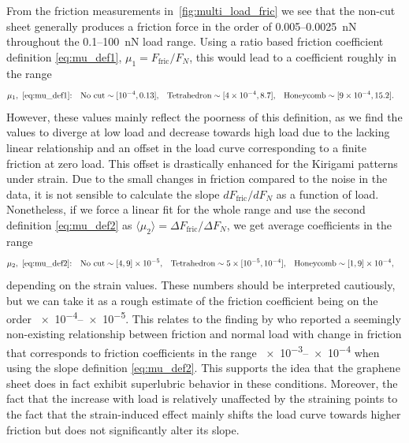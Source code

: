 From the friction measurements in~\cref{fig:multi_load_fric} we see that the
non-cut sheet generally produces a friction force in the order of 0.005--\SI{0.0025}{nN} throughout the 0.1--\SI{100}{nN} load range. Using a ratio based friction coefficient definition \cref{eq:mu_def1}, $\mu_1 = F_{\text{fric}}/{F_N}$, this would lead to a coefficient roughly in the range
\begin{align*}
  &\mu_1,  \ \text{\cref{eq:mu_def1}:}& &\text{No cut}\sim [\num{e-4}, 0.13],&  &\text{Tetrahedron}\sim [\num{4e-4},8.7],& &\text{Honeycomb}\sim [\num{9e-4}, 15.2].&
\end{align*}
However, these values mainly reflect the poorness of this definition, as we find the values to diverge at low load and decrease towards high load due to the lacking linear relationship and an offset in the load curve corresponding to a finite friction at zero load. This offset is drastically enhanced for the Kirigami patterns under strain. Due to the small changes in friction compared to the noise in the data, it is not sensible to calculate the slope $dF_{\text{fric}}/dF_N$ as a function of load. Nonetheless, if we force a linear fit for the whole range and use the second definition \cref{eq:mu_def2} as $\langle \mu_2 \rangle = \Delta F_{\text{fric}}/\Delta F_N$, we get average coefficients in the range
\begin{align*}
  &\mu_2,  \ \text{\cref{eq:mu_def2}:}& &\text{No cut} \sim [4, 9]\times \num{e-5},&  &\text{Tetrahedron} \sim 5\times[\num{e-5}, \num{e-4}],& &\text{Honeycomb} \sim [1,9]\times \num{e-4},&
\end{align*}
depending on the strain values. These numbers should be interpreted cautiously,
but we can take it as a rough estimate of the friction coefficient being on
the order \num{e-4}--\num{e-5}. This relates to the finding by
\cite{DIENWIEBEL2005197} who reported a seemingly non-existing relationship
between friction and normal load with change in friction that corresponds to friction coefficients in the range \num{e-3}--\num{e-4} when using the slope definition \cref{eq:mu_def2}. This supports the idea that the graphene sheet does in fact exhibit superlubric behavior in these conditions. Moreover, the fact that the increase with load is relatively unaffected by the straining points to the fact that the strain-induced effect mainly shifts the load curve towards higher friction but does not significantly alter its slope. 


%
%
%
%
%


